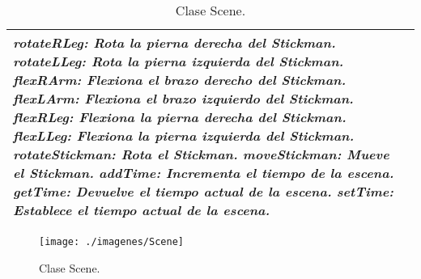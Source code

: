 \begin{table}[!ht]
\begin{tabular}{|p{4cm}|p{11.5cm}|}
                                    \textit{\textbf{rotateRLeg}: Rota la pierna derecha del Stickman.}\newline
                                    \textit{\textbf{rotateLLeg}: Rota la pierna izquierda del Stickman.}\newline
                                    \textit{\textbf{flexRArm}: Flexiona el brazo derecho del Stickman.}\newline
                                    \textit{\textbf{flexLArm}: Flexiona el brazo izquierdo del Stickman.}\newline
                                    \textit{\textbf{flexRLeg}: Flexiona la pierna derecha del Stickman.}\newline
                                    \textit{\textbf{flexLLeg}: Flexiona la pierna izquierda del Stickman.}\newline
                                    \textit{\textbf{rotateStickman}: Rota el Stickman.}\newline
                                    \textit{\textbf{moveStickman}: Mueve el Stickman.}\newline
                                    \textit{\textbf{addTime}: Incrementa el tiempo de la escena.}\newline
                                    \textit{\textbf{getTime}: Devuelve el tiempo actual de la escena.}\newline
                                    \textit{\textbf{setTime}: Establece el tiempo actual de la escena.}\\ \hline
            \end{tabular}
            \caption{Clase Scene.}
         \end{table}
         \begin{figure} [H] \begin{center}
            \texttt{[image: ./imagenes/Scene]}\label{Scene}
            \caption{Clase Scene.}
         \end{center} \end{figure}

